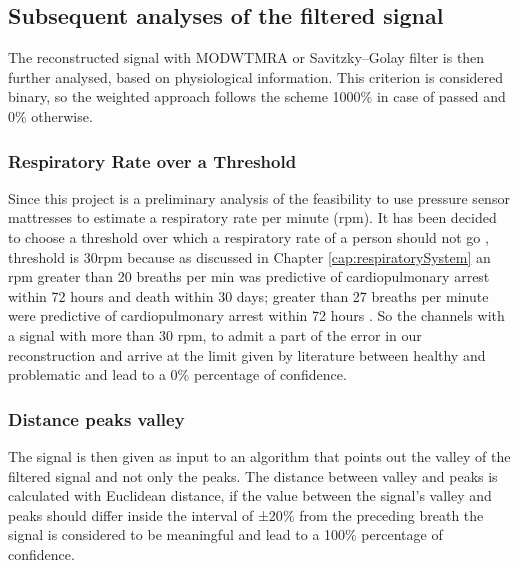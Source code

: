 \vspace*{0.3cm}



\subsection{Subsequent analyses of the filtered signal}
The reconstructed signal with MODWTMRA or Savitzky–Golay filter is then further analysed, based on physiological information. This criterion is considered binary, so the weighted approach follows the scheme 1000\% in case of passed and 0\% otherwise.

\subsubsection{Respiratory Rate over a Threshold}\label{threshold}
Since this project is a preliminary analysis of the feasibility to use pressure sensor mattresses to estimate a respiratory rate per minute (rpm). It has been decided to choose a threshold over which a respiratory rate of a person should not go %
, threshold is 30rpm because as discussed in Chapter \ref{cap:respiratorySystem} an rpm greater than 20 breaths per min was predictive of cardiopulmonary arrest within 72 hours and death within 30 days\cite{Hong2013HowPatients}; greater than 27 breaths per minute were predictive of cardiopulmonary arrest within 72 hours \cite{Fieselmann1993RespiratoryInpatients}.
So %
the channels with a signal with more than 30 rpm, to admit a part of the error in our reconstruction and arrive at the limit given by literature between healthy and problematic and lead to a 0\% percentage of confidence.

\subsubsection{Distance peaks valley} \label{cap:Euclidian}
The signal is then given as input to an algorithm that points out the valley of the filtered signal and not only the peaks.
The distance between valley and peaks is calculated with Euclidean distance, if the value between the signal's valley and peaks should differ inside the interval of ±20$\%$ from the preceding breath the signal is considered to be meaningful and lead to a 100\% percentage of confidence.
\vspace*{0.5cm}

